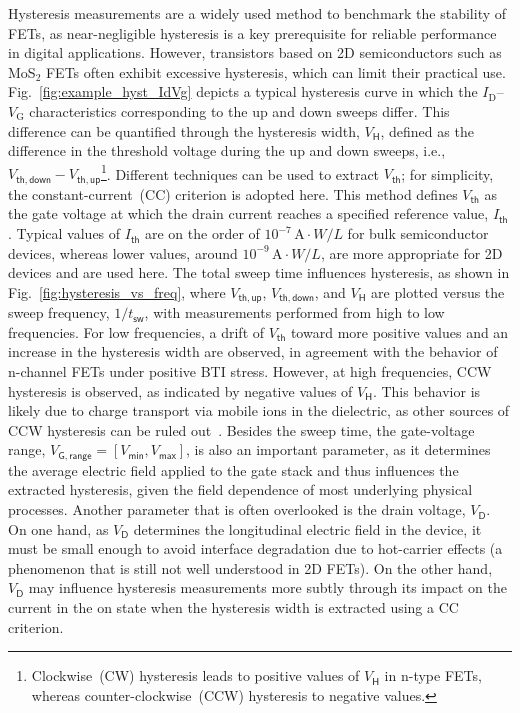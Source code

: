 \documentclass[conference]{IEEEtran}
\begin{document}
Hysteresis measurements are a widely used method to benchmark the stability of FETs, as near-negligible hysteresis is a key prerequisite for reliable performance in digital applications. However, transistors based on 2D semiconductors such as MoS$_2$ FETs often exhibit excessive hysteresis, which can limit their practical use. Fig.~\ref{fig:example_hyst_IdVg} depicts a typical hysteresis curve in which the $I_\mathrm{D}$--$V_\mathrm{G}$ characteristics corresponding to the up and down sweeps differ. This difference can be quantified through the hysteresis width, $V_\mathsf{H}$, defined as the difference in the threshold voltage during the up and down sweeps, i.e., $V_\mathsf{th,down} - V_\mathsf{th,up}$\footnote{Clockwise~(CW) hysteresis leads to positive values of $V_\mathsf{H}$ in n-type FETs, whereas counter-clockwise~(CCW) hysteresis to negative values.}. Different techniques can be used to extract $V_\mathsf{th}$; for simplicity, the constant-current~(CC) criterion is adopted here. This method defines $V_\mathsf{th}$ as the gate voltage at which the drain current reaches a specified reference value, $I_\mathsf{th}$. Typical values of $I_\mathsf{th}$ are on the order of $10^{-7}\,\mathrm{A}\cdot W/L$ for bulk semiconductor devices, whereas lower values, around $10^{-9}\,\mathrm{A}\cdot W/L$, are more appropriate for 2D devices and are used here. The total sweep time influences hysteresis, as shown in Fig.~\ref{fig:hysteresis_vs_freq}, where $V_\mathsf{th,up}$, $V_\mathsf{th,down}$, and $V_\mathsf{H}$ are plotted versus the sweep frequency, $1/t_\mathsf{sw}$, with measurements performed from high to low frequencies. For low frequencies, a drift of $V_\mathsf{th}$ toward more positive values and an increase in the hysteresis width are observed, in agreement with the behavior of n-channel FETs under positive BTI stress. However, at high frequencies, CCW hysteresis is observed, as indicated by negative values of $V_\mathsf{H}$. This behavior is likely due to charge transport via mobile ions in the dielectric, as other sources of CCW hysteresis can be ruled out~\cite{karl_standardized_2025}.
Besides the sweep time, the gate-voltage range, $V_\mathsf{G,range} = [V_\mathsf{min}, V_\mathsf{max}]$, is also an important parameter, as it determines the average electric field applied to the gate stack and thus influences the extracted hysteresis, given the field dependence of most underlying physical processes. Another parameter that is often overlooked is the drain voltage, $V_\mathsf{D}$. On one hand, as $V_\mathsf{D}$ determines the longitudinal electric field in the device, it must be small enough to avoid interface degradation due to hot-carrier effects (a phenomenon that is still not well understood in 2D FETs). On the other hand, $V_\mathsf{D}$ may influence hysteresis measurements more subtly through its impact on the current in the on state when the hysteresis width is extracted using a CC criterion.
\end{document}
